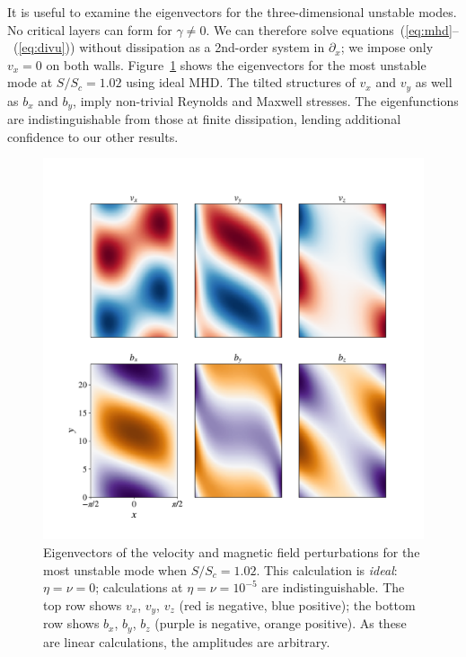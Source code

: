 \documentclass[aps,prl,reprint,superscriptaddress]{revtex4-1}
\newcommand{\SSC}{S/S_{c}}
\begin{document}
It is useful to examine the eigenvectors for the three-dimensional unstable modes.
No critical layers can form for $\gamma \ne 0$.
We can therefore solve equations~(\ref{eq:mhd}--~(\ref{eq:divu})) without dissipation as a 2nd-order system in $\partial_{x}$;
we impose only $v_x = 0$ on both walls.
Figure~\ref{fig:eigvec} shows the eigenvectors for the most unstable mode at $\SSC = 1.02$ using ideal MHD. 
The tilted structures of $v_x$ and $v_y$ as well as $b_x$ and $b_y$, imply non-trivial Reynolds and Maxwell stresses.
The eigenfunctions are indistinguishable from those at finite dissipation, lending additional confidence to our other results.

\begin{figure}[h!]
  \centering
  \includegraphics[width=\columnwidth]{eigvecs_xy_run_11_ideal_single_mode.pdf}
  \caption{Eigenvectors of the velocity and magnetic field perturbations for the most unstable mode when $\SSC = 1.02$. This calculation is \emph{ideal}: $\eta = \nu = 0$; calculations at $\eta = \nu = 10^{-5}$ are indistinguishable.  The top row shows $v_x$, $v_y$, $v_z$ (red is negative, blue positive); the bottom row shows $b_x$, $b_y$, $b_z$ (purple is negative, orange positive). As these are linear calculations, the amplitudes are arbitrary.}
  \label{fig:eigvec}
\end{figure}
\end{document}
